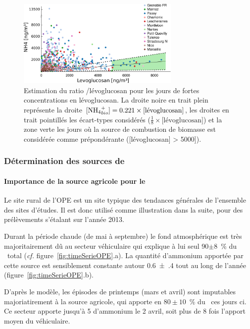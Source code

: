 \begin{figure}[ht]
    \centering
    \includegraphics[width=0.7\textwidth]{figures/INACS/MCA_correlNH4Levo_alea.pdf}
    \caption{Estimation du ratio \NHq/lévoglucosan pour les jours de fortes concentrations en
        lévoglucosan. La droite noire en trait plein représente la droite $[\NHq_{bio}]=
        0.221 \times \text{[lévoglucosan]}$, les droites en trait pointillés les
        écart-types considérés ($\frac{1}{8}\times \text{[lévoglucosan]}$) et la zone
        verte les jours où la source de combustion de biomasse est considérée comme
        prépondérante ([lévoglucosan] > \SI{5000}{\ugm}]).
    }
    \label{fig:correlNH4Levo}
\end{figure}

\subsubsection{Détermination des sources de \NHq}%
\label{ssub:determination_des_sources_de_NHq}

\paragraph{Importance de la source agricole pour le \NHq}%
\label{par:importance_de_la_source_agricole_pour_le_nhq}

Le site rural de l'OPE est un site typique des tendances générales de l'ensemble des sites
d'études.
Il est donc utilisé comme illustration dans la suite, pour des prélèvements s'étalant sur
l'année 2013.

Durant la période chaude (de mai à septembre) le fond atmosphérique est très
majoritairement dû au secteur véhiculaire qui explique à lui seul 90$\pm$8~\% du
\NHq~total (\textit{cf.} figure~\ref{fig:timeSerieOPE}.a).
La quantité d'ammonium apportée par cette source est sensiblement constante autour
\SI{0.6(4)}{\ugm} tout au long de l'année (figure~\ref{fig:timeSerieOPE}.b).

D'après le modèle, les épisodes de printemps (mars et avril) sont imputables
majoriatirement à la source agricole, qui apporte en $80\pm10$~\% du \NHq~ces jours ci.
Ce secteur apporte jusqu'à \SI{5}{\ugm} d'ammonium le 2 avril, soit plus de 8 fois
l'apport moyen du véhiculaire.

